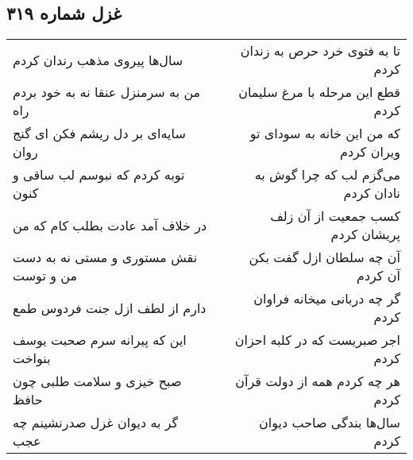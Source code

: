 \begin{center}
\section*{غزل شماره ۳۱۹}
\label{sec:sh319}
\begin{longtable}{l p{0.5cm} r}
سال‌ها پیروی مذهب رندان کردم
&&
تا به فتوی خرد حرص به زندان کردم
\\
من به سرمنزل عنقا نه به خود بردم راه
&&
قطع این مرحله با مرغ سلیمان کردم
\\
سایه‌ای بر دل ریشم فکن ای گنج روان
&&
که من این خانه به سودای تو ویران کردم
\\
توبه کردم که نبوسم لب ساقی و کنون
&&
می‌گزم لب که چرا گوش به نادان کردم
\\
در خلاف آمد عادت بطلب کام که من
&&
کسب جمعیت از آن زلف پریشان کردم
\\
نقش مستوری و مستی نه به دست من و توست
&&
آن چه سلطان ازل گفت بکن آن کردم
\\
دارم از لطف ازل جنت فردوس طمع
&&
گر چه دربانی میخانه فراوان کردم
\\
این که پیرانه سرم صحبت یوسف بنواخت
&&
اجر صبریست که در کلبه احزان کردم
\\
صبح خیزی و سلامت طلبی چون حافظ
&&
هر چه کردم همه از دولت قرآن کردم
\\
گر به دیوان غزل صدرنشینم چه عجب
&&
سال‌ها بندگی صاحب دیوان کردم
\\
\end{longtable}
\end{center}
